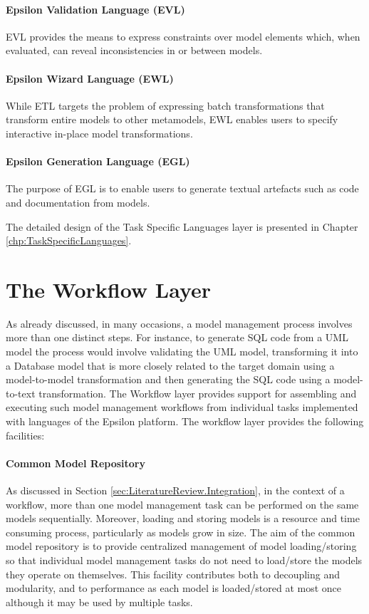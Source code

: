 \paragraph{Epsilon Validation Language (EVL)} EVL provides the means to express constraints over model elements which, when evaluated, can reveal inconsistencies in or between models.

\paragraph{Epsilon Wizard Language (EWL)} While ETL targets the problem of expressing batch transformations that transform entire models to other metamodels, EWL enables users to specify interactive in-place model transformations.

\paragraph{Epsilon Generation Language (EGL)} The purpose of EGL is to enable users to generate textual artefacts such as code and documentation from models.

\noindent The detailed design of the Task Specific Languages layer is presented in Chapter \ref{chp:TaskSpecificLanguages}.

\section{The Workflow Layer}
\label{sec:Architecture.Workflow}

As already discussed, in many occasions, a model management process involves more than one distinct steps. For instance, to generate SQL code from a UML model the process would involve validating the UML model, transforming it into a Database model that is more closely related to the target domain using a model-to-model transformation and then generating the SQL code using a model-to-text transformation. The Workflow layer provides support for assembling and executing such model management workflows from individual tasks implemented with languages of the Epsilon platform. The workflow layer provides the following facilities:

\paragraph{Common Model Repository} As discussed in Section \ref{sec:LiteratureReview.Integration}, in the context of a workflow, more than one model management task can be performed on the same models sequentially. Moreover, loading and storing models is a resource and time consuming process, particularly as models grow in size. The aim of the common model repository is to provide centralized management of model loading/storing so that individual model management tasks do not need to load/store the models they operate on themselves. This facility contributes both to decoupling and modularity, and to performance as each model is loaded/stored at most once although it may be used by multiple tasks.

